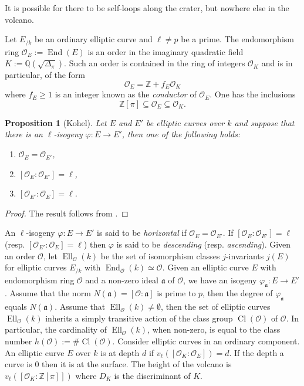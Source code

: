 \documentclass[table]{amsart}
\newtheorem{proposition}[theorem]{Proposition}
\newcommand{\Z}{\mathbb{Z}}
\newcommand{\Q}{\mathbb{Q}}
\newcommand{\cO}{\mathcal{O}}
\newcommand{\op}[1]{\operatorname{#1}}
\numberwithin{equation}{section}
\begin{document}
\noindent It is possible for there to be self-loops along the crater, but nowhere else in the volcano.
\par Let $E_{/k}$ be an ordinary elliptic curve and $\ell\neq p$ be a prime. The endomorphism ring $\cO_E:=\op{End}(E)$ is an order in the imaginary quadratic field $K:=\Q(\sqrt{\Delta_\pi})$. Such an order is contained in the ring of integers $\cO_K$ and is in particular, of the form
\[\cO_E=\Z+f_E\cO_K\] where $f_E\geq 1$ is an integer known as the \emph{conductor} of $\cO_E$. One has the inclusions 
\[\Z[\pi]\subseteq \cO_E\subseteq \cO_K. \]

\begin{proposition}[Kohel]
    Let $E$ and $E'$ be elliptic curves over $k$ and suppose that there is an $\ell$-isogeny $\varphi: E\rightarrow E'$, then one of the following holds:
    \begin{enumerate}
        \item $\cO_E=\cO_{E'}$, 
        \item $[\cO_E:\cO_{E'}]=\ell$,
        \item $[\cO_{E'}:\cO_E]=\ell$.
    \end{enumerate}
\end{proposition}
\begin{proof}
    The result follows from \cite[Proposition~21, p.~44]{kohel}. 
\end{proof}
\noindent An $\ell$-isogeny $\varphi: E\rightarrow E'$ is said to be \emph{horizontal} if $\cO_{E}=\cO_{E'}$. If $[\cO_E:\cO_{E'}]=\ell$ (resp. $[\cO_{E'}:\cO_{E}]=\ell$) then $\varphi$ is said to be \emph{descending} (resp. \emph{ascending}). Given an order $\cO$, let $\op{Ell}_{\cO}(k)$ be the set of isomorphism classes $j$-invariants $j(E)$ for elliptic curves $E_{/k}$ with $\op{End}_{\cO}(k)\simeq \cO$. Given an elliptic curve $E$ with endomorphism ring $\cO$ and a non-zero ideal $\mathfrak{a}$ of $\cO$, we have an isogeny $\varphi_{\mathfrak{a}}:E\rightarrow E'$. Assume that the norm $N(\mathfrak{a})=[\cO:\mathfrak{a}]$ is prime to $p$, then the degree of $\varphi_{\mathfrak{a}}$ equals $N(\mathfrak{a})$. Assume that $\op{Ell}_{\cO}(k)\neq \emptyset$, then the set of elliptic curves $\op{Ell}_{\cO}(k)$ inherits a simply transitive action of the class group $\op{Cl}(\cO)$ of $\cO$. In particular, the cardinality of $\op{Ell}_{\cO}(k)$, when non-zero, is equal to the class number $h(\cO):=\# \op{Cl}(\cO)$. Consider elliptic curves in an ordinary component. An elliptic curve $E$ over $k$ is at depth $d$ if $v_\ell([\cO_K:\cO_E])=d$. If the depth a curve is $0$ then it is at the surface. The height of the volcano is $v_\ell\left([\cO_K: \Z[\pi]]\right)$ where $D_K$ is the discriminant of $K$.
\end{document}
